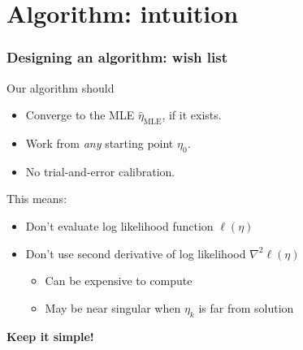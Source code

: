\documentclass[ 10pt]{beamer}
\newcommand{\etaMLE}{\hat{\eta}_{\textrm{MLE}}}
\begin{document}
\section{Algorithm: intuition}
\frame
{
\frametitle{Designing an algorithm: wish list}

Our algorithm should
\begin{itemize}
\item Converge to the MLE $\etaMLE$, if it exists.
\item Work from \emph{any} starting point $\eta_0$.
\item No trial-and-error calibration.
\end{itemize}
\vspace{3mm}

\pause
This means:
\begin{itemize}
\item Don't evaluate log likelihood function $\ell( \eta)$
\vspace{1mm}

\item Don't use second derivative of log likelihood $\nabla^2 \ell( \eta)$
\begin{itemize}
	\item Can be expensive to compute
	\item May be near singular when $\eta_k$ is far from solution
\end{itemize}
\end{itemize}

\textbf{Keep it simple!} %
}
\end{document}
